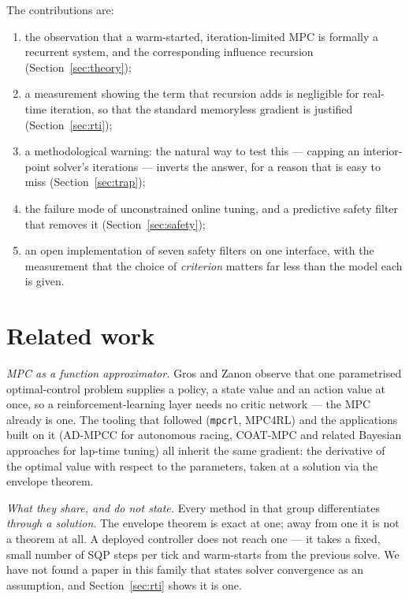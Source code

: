 \documentclass[letterpaper, 10 pt, conference]{ieeeconf}
\begin{document}
The contributions are:
\begin{enumerate}
  \item the observation that a warm-started, iteration-limited MPC is
        formally a recurrent system, and the corresponding influence recursion
        (Section~\ref{sec:theory});
  \item a measurement showing the term that recursion adds is negligible for
        real-time iteration, so that the standard memoryless gradient is
        justified (Section~\ref{sec:rti});
  \item a methodological warning: the natural way to test this --- capping an
        interior-point solver's iterations --- inverts the answer, for a reason
        that is easy to miss (Section~\ref{sec:trap});
  \item the failure mode of unconstrained online tuning, and a predictive
        safety filter that removes it (Section~\ref{sec:safety});
  \item an open implementation of seven safety filters on one interface, with
        the measurement that the choice of \emph{criterion} matters far less
        than the model each is given.
\end{enumerate}

\section{Related work}

\emph{MPC as a function approximator.} Gros and Zanon observe that one
parametrised optimal-control problem supplies a policy, a state value and an
action value at once, so a reinforcement-learning layer needs no critic network
--- the MPC already is one. The tooling that followed (\texttt{mpcrl},
MPC4RL) and the applications built on it (AD-MPCC for autonomous racing,
COAT-MPC and related Bayesian approaches for lap-time tuning) all inherit the
same gradient: the derivative of the optimal value with respect to the
parameters, taken at a solution via the envelope theorem.

\emph{What they share, and do not state.} Every method in that group
differentiates \emph{through a solution}. The envelope theorem is exact at one;
away from one it is not a theorem at all. A deployed controller does not reach
one --- it takes a fixed, small number of SQP steps per tick and warm-starts
from the previous solve. We have not found a paper in this family that states
solver convergence as an assumption, and Section~\ref{sec:rti} shows it is one.
\end{document}
